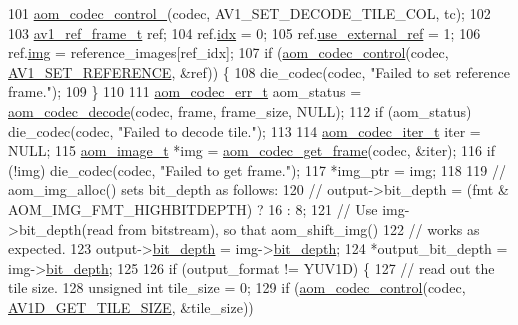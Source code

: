 \begin{DoxyCodeInclude}
{101   \hyperlink{group__codec_ga51eb332a40dcacc39000ab8e0be36b79}{aom\_codec\_control\_}(codec, AV1\_SET\_DECODE\_TILE\_COL, tc);
102 
103   \hyperlink{structav1__ref__frame}{av1\_ref\_frame\_t} ref;
104   ref.\hyperlink{structav1__ref__frame_a7c6fcaba58f514985448cb2e2245345c}{idx} = 0;
105   ref.\hyperlink{structav1__ref__frame_a33749c5c20033cc5f7582d0ec1c34ff0}{use\_external\_ref} = 1;
106   ref.\hyperlink{structav1__ref__frame_a55a09db9e1acdd73e656b01fa01283b3}{img} = reference\_images[ref\_idx];
107   \textcolor{keywordflow}{if} (\hyperlink{group__codec_ga6da974f4eeaba1fa74106b28d0fe6ac5}{aom\_codec\_control}(codec, \hyperlink{group__aom_gga9421a1fa78c0d9587ae5aa6c1cb3d659a51ad4467b4dc318406cceb257e2daa41}{AV1\_SET\_REFERENCE}, &ref)) \{
108     die\_codec(codec, \textcolor{stringliteral}{"Failed to set reference frame."});
109   \}
110 
111   \hyperlink{group__codec_gaaae61e0f8663e6137f1e228757248e7c}{aom\_codec\_err\_t} aom\_status = \hyperlink{group__decoder_gab03fdb999d1f83a5896869a3ba5f68f7}{aom\_codec\_decode}(codec, frame, frame\_size, 
      NULL);
112   \textcolor{keywordflow}{if} (aom\_status) die\_codec(codec, \textcolor{stringliteral}{"Failed to decode tile."});
113 
114   \hyperlink{group__codec_gadf9e173c9e02788a9999399edab20a02}{aom\_codec\_iter\_t} iter = NULL;
115   \hyperlink{structaom__image}{aom\_image\_t} *img = \hyperlink{group__decoder_ga780aad27a2728abefab725faa3bc4f79}{aom\_codec\_get\_frame}(codec, &iter);
116   \textcolor{keywordflow}{if} (!img) die\_codec(codec, \textcolor{stringliteral}{"Failed to get frame."});
117   *img\_ptr = img;
118 
119   \textcolor{comment}{// aom\_img\_alloc() sets bit\_depth as follows:}
120   \textcolor{comment}{// output->bit\_depth = (fmt & AOM\_IMG\_FMT\_HIGHBITDEPTH) ? 16 : 8;}
121   \textcolor{comment}{// Use img->bit\_depth(read from bitstream), so that aom\_shift\_img()}
122   \textcolor{comment}{// works as expected.}
123   output->\hyperlink{structaom__image_a46ed9ffd741938d306a0db5a24bdcf8e}{bit\_depth} = img->\hyperlink{structaom__image_a46ed9ffd741938d306a0db5a24bdcf8e}{bit\_depth};
124   *output\_bit\_depth = img->\hyperlink{structaom__image_a46ed9ffd741938d306a0db5a24bdcf8e}{bit\_depth};
125 
126   \textcolor{keywordflow}{if} (output\_format != YUV1D) \{
127     \textcolor{comment}{// read out the tile size.}
128     \textcolor{keywordtype}{unsigned} \textcolor{keywordtype}{int} tile\_size = 0;
129     \textcolor{keywordflow}{if} (\hyperlink{group__codec_ga6da974f4eeaba1fa74106b28d0fe6ac5}{aom\_codec\_control}(codec, \hyperlink{group__aom__decoder_gga3865fd4b3192489baa9a5c3632ebe97ba4d9799d9e520785870b8d1f73a19c3c4}{AV1D\_GET\_TILE\_SIZE}, &tile\_size))
}
\end{DoxyCodeInclude}
